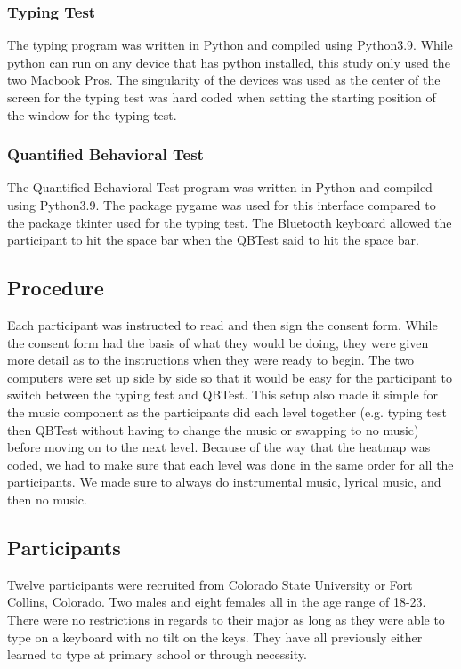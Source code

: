 \documentclass[manuscript, screen, review]{acmart} %
\begin{document}
\subsubsection{Typing Test}
The typing program was written in Python and compiled using Python3.9. 
While python can run on any device that has python installed, this study only used the two Macbook Pros. 
The singularity of the devices was used as the center of the screen for the typing test was hard coded when setting the starting position of the window for the typing test. 

\subsubsection{Quantified Behavioral Test}
The Quantified Behavioral Test program was written in Python and compiled using Python3.9.
The package pygame was used for this interface compared to the package tkinter used for the typing test.
The Bluetooth keyboard allowed the participant to hit the space bar when the QBTest said to hit the space bar.

\subsection[short]{Procedure}
Each participant was instructed to read and then sign the consent form. While the consent form had the basis of what they would be doing, they were given more detail as to the instructions when they were ready to begin.
The two computers were set up side by side so that it would be easy for the participant to switch between the typing test and QBTest.
This setup also made it simple for the music component as the participants did each level together 
(e.g. typing test then QBTest without having to change the music or swapping to no music)
before moving on to the next level. 
Because of the way that the heatmap was coded, we had to make sure that each level was done in the same order for all the participants.
We made sure to always do instrumental music, lyrical music, and then no music. 

\subsection[short]{Participants}
Twelve participants were recruited from Colorado State University or Fort Collins, Colorado. Two males and eight females all in the age range of 18-23. There were no restrictions in regards to their major as long as they were able to type on a keyboard with no tilt on the keys.
They have all previously either learned to type at primary school or through necessity.
\end{document}
